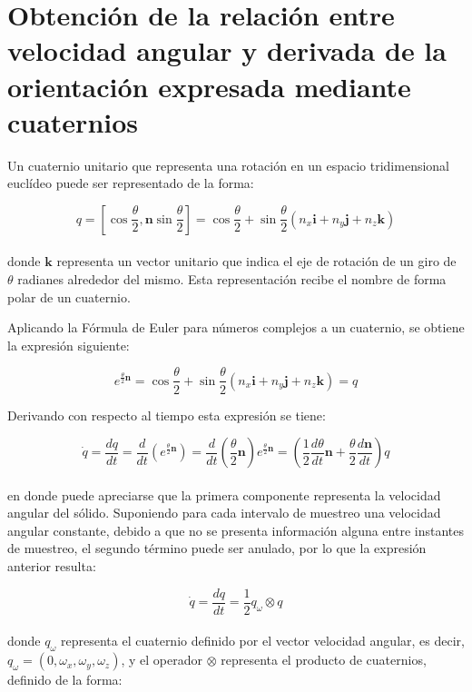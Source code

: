\chapter[Relación entre vel. angular y variación de la orientación]{Obtención de la relación entre velocidad angular y derivada de la orientación expresada mediante cuaternios}
\label{app:demoA1}

Un cuaternio unitario que representa una rotación en un espacio tridimensional euclídeo puede ser representado de la forma:

\[ q = [\cos\frac{\theta}{2}, \boldsymbol{n} \sin\frac{\theta}{2}] 
 = \cos\frac{\theta}{2} + \sin\frac{\theta}{2}(n_x\boldsymbol{i} + n_y\boldsymbol{j} + n_z\boldsymbol{k}) \] \\
\noindent
donde $\boldsymbol{k}$ representa un vector unitario que indica el eje de rotación de un giro de $\theta$ radianes alrededor del mismo. Esta representación recibe el nombre de forma polar de un cuaternio. \par 

Aplicando la Fórmula de Euler para números complejos a un cuaternio, se obtiene la expresión siguiente: 

\begin{equation}
e^{\frac{\theta}{2}\boldsymbol{n}} = \cos\frac{\theta}{2} + \sin\frac{\theta}{2}(n_x\boldsymbol{i} + n_y\boldsymbol{j} + n_z\boldsymbol{k}) = q
\end{equation}

Derivando con respecto al tiempo esta expresión se tiene:

\begin{equation}
\dot{q} = \frac{d q}{dt} = \frac{d}{dt}(e^{\frac{\theta}{2}\boldsymbol{n}}) = 
	\frac{d}{dt}(\frac{\theta}{2}\boldsymbol{n})e^{\frac{\theta}{2}\boldsymbol{n}} = 
	(\frac{1}{2}\frac{d\theta}{dt}\boldsymbol{n} + \frac{\theta}{2}\frac{d\boldsymbol{n}}{dt})q
\end{equation} \\
\noindent
en donde puede apreciarse que la primera componente representa la velocidad angular del sólido. Suponiendo para cada intervalo de muestreo una velocidad angular constante, debido a que no se presenta información alguna entre instantes de muestreo, el segundo término puede ser anulado, por lo que la expresión anterior resulta:

\begin{equation}
\dot{q} = \frac{d q}{dt} = \frac{1}{2}q_\omega \otimes q
\end{equation}
\\
\noindent
donde $q_\omega$ representa el cuaternio definido por el vector velocidad angular, es decir, $q_\omega = (0,\omega_x,\omega_y,\omega_z)$, y el operador $\otimes$ representa el producto de cuaternios, definido de la forma:

